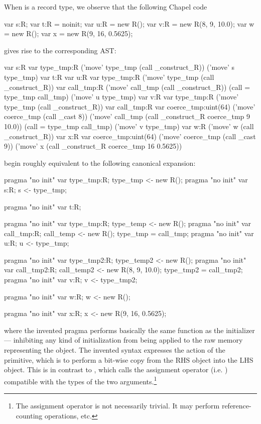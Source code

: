 When  is a record type, we observe that the following Chapel code
\begin{chapel}
  var s:R;
  var t:R = noinit;
  var u:R = new R();
  var v:R = new R(8, 9, 10.0);
  var w = new R();
  var x = new R(9, 16, 0.5625);
\end{chapel}
\noindent
gives rise to the corresponding AST:
\begin{numberedchapel}
    var s:R
    {
      var type_tmp:R
      ('move' type_tmp (call _construct_R))
      ('move' s type_tmp)
    }
    var t:R
    var u:R
    {
      var type_tmp:R
      ('move' type_tmp (call _construct_R))
      var call_tmp:R
      ('move' call_tmp (call _construct_R))
      (call = type_tmp call_tmp)
      ('move' u type_tmp)
    }
    var v:R
    {
      var type_tmp:R
      ('move' type_tmp (call _construct_R))
      var call_tmp:R
      var coerce_tmp:uint(64)
      ('move' coerce_tmp (call _cast 8))
      ('move' call_tmp (call _construct_R coerce_tmp 9 10.0))
      (call = type_tmp call_tmp)
      ('move' v type_tmp)
    }
    var w:R
    ('move' w (call _construct_R))
    var x:R
    var coerce_tmp:uint(64)
    ('move' coerce_tmp (call _cast 9))
    ('move' x (call _construct_R coerce_tmp 16 0.5625))
\end{numberedchapel}
\noindent
begin roughly equivalent to the following canonical expansion:
\begin{chapel}
  pragma "no init" var type_tmp:R; type_tmp <- new R();
  pragma "no init" var s:R; s <- type_tmp;

  pragma "no init" var t:R;

  pragma "no init" var type_tmp:R; type_temp <- new R();
  pragma "no init" var call_tmp:R; call_temp <- new R();
  type_tmp = call_tmp;
  pragma "no init" var u:R; u <- type_tmp;

  pragma "no init" var type_tmp2:R; type_temp2 <- new R();
  pragma "no init" var call_tmp2:R; call_temp2 <- new R(8, 9, 10.0);
  type_tmp2 = call_tmp2;
  pragma "no init" var v:R; v <- type_tmp2;

  pragma "no init" var w:R; w <- new R();

  pragma "no init" var x:R; x <- new R(9, 16, 0.5625);
\end{chapel}
\noindent
where the invented pragma  performs basically the same function as the
 initializer --- inhibiting any kind of initialization from being applied
to the raw memory representing the object.  The invented syntax \chpl{<-} expresses the
action of the  primitive, which is to perform a bit-wise copy from the RHS
object into the LHS object.  This is in contrast to \chpl{=}, which calls the assignment
operator (i.e. ) compatible with the types of the two arguments.\footnote{The
assignment operator is not necessarily trivial.  It may perform reference-counting
operations, etc.}

